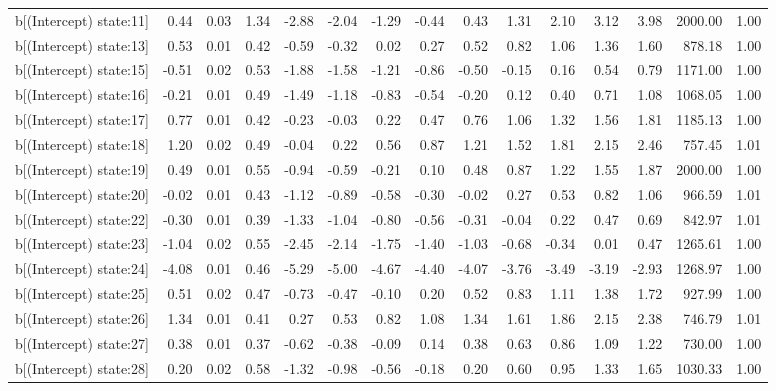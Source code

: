 \begin{table}[ht]
\begin{tabular}{rrrrrrrrrrrrrrr}
  b[(Intercept) state:11] & 0.44 & 0.03 & 1.34 & -2.88 & -2.04 & -1.29 & -0.44 & 0.43 & 1.31 & 2.10 & 3.12 & 3.98 & 2000.00 & 1.00 \\ 
  b[(Intercept) state:13] & 0.53 & 0.01 & 0.42 & -0.59 & -0.32 & 0.02 & 0.27 & 0.52 & 0.82 & 1.06 & 1.36 & 1.60 & 878.18 & 1.00 \\ 
  b[(Intercept) state:15] & -0.51 & 0.02 & 0.53 & -1.88 & -1.58 & -1.21 & -0.86 & -0.50 & -0.15 & 0.16 & 0.54 & 0.79 & 1171.00 & 1.00 \\ 
  b[(Intercept) state:16] & -0.21 & 0.01 & 0.49 & -1.49 & -1.18 & -0.83 & -0.54 & -0.20 & 0.12 & 0.40 & 0.71 & 1.08 & 1068.05 & 1.00 \\ 
  b[(Intercept) state:17] & 0.77 & 0.01 & 0.42 & -0.23 & -0.03 & 0.22 & 0.47 & 0.76 & 1.06 & 1.32 & 1.56 & 1.81 & 1185.13 & 1.00 \\ 
  b[(Intercept) state:18] & 1.20 & 0.02 & 0.49 & -0.04 & 0.22 & 0.56 & 0.87 & 1.21 & 1.52 & 1.81 & 2.15 & 2.46 & 757.45 & 1.01 \\ 
  b[(Intercept) state:19] & 0.49 & 0.01 & 0.55 & -0.94 & -0.59 & -0.21 & 0.10 & 0.48 & 0.87 & 1.22 & 1.55 & 1.87 & 2000.00 & 1.00 \\ 
  b[(Intercept) state:20] & -0.02 & 0.01 & 0.43 & -1.12 & -0.89 & -0.58 & -0.30 & -0.02 & 0.27 & 0.53 & 0.82 & 1.06 & 966.59 & 1.01 \\ 
  b[(Intercept) state:22] & -0.30 & 0.01 & 0.39 & -1.33 & -1.04 & -0.80 & -0.56 & -0.31 & -0.04 & 0.22 & 0.47 & 0.69 & 842.97 & 1.01 \\ 
  b[(Intercept) state:23] & -1.04 & 0.02 & 0.55 & -2.45 & -2.14 & -1.75 & -1.40 & -1.03 & -0.68 & -0.34 & 0.01 & 0.47 & 1265.61 & 1.00 \\ 
  b[(Intercept) state:24] & -4.08 & 0.01 & 0.46 & -5.29 & -5.00 & -4.67 & -4.40 & -4.07 & -3.76 & -3.49 & -3.19 & -2.93 & 1268.97 & 1.00 \\ 
  b[(Intercept) state:25] & 0.51 & 0.02 & 0.47 & -0.73 & -0.47 & -0.10 & 0.20 & 0.52 & 0.83 & 1.11 & 1.38 & 1.72 & 927.99 & 1.00 \\ 
  b[(Intercept) state:26] & 1.34 & 0.01 & 0.41 & 0.27 & 0.53 & 0.82 & 1.08 & 1.34 & 1.61 & 1.86 & 2.15 & 2.38 & 746.79 & 1.01 \\ 
  b[(Intercept) state:27] & 0.38 & 0.01 & 0.37 & -0.62 & -0.38 & -0.09 & 0.14 & 0.38 & 0.63 & 0.86 & 1.09 & 1.22 & 730.00 & 1.00 \\ 
  b[(Intercept) state:28] & 0.20 & 0.02 & 0.58 & -1.32 & -0.98 & -0.56 & -0.18 & 0.20 & 0.60 & 0.95 & 1.33 & 1.65 & 1030.33 & 1.00 \\ 

\end{tabular}
\end{table}
